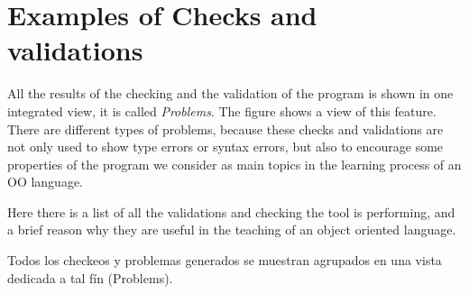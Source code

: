\appendix

\section{Examples of Checks and validations}

All the results of the checking and the validation of the program is shown in one integrated view, it is called \emph{Problems}. The figure  shows a view of this feature. 
There are different types of problems, because these checks and validations are not only used to show type errors or syntax errors, but also to encourage some properties of the program we consider as main topics in the learning process of an OO language.

Here there is a list of all the validations and checking the tool is performing, and a brief reason why they are useful in the teaching of an object oriented language.

Todos los checkeos y problemas
generados se muestran agrupados en una vista dedicada a tal fín (Problems).


